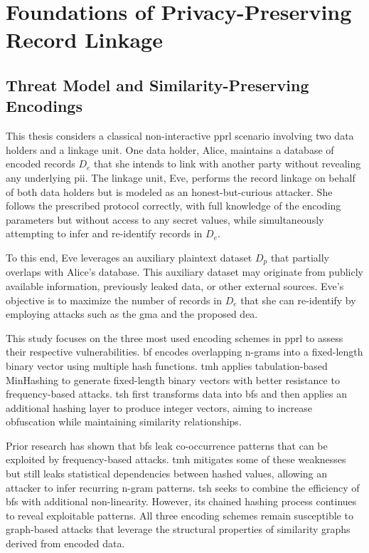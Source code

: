 \documentclass[a4paper,11pt]{scrartcl}
\begin{document}
\section{Foundations of Privacy-Preserving Record Linkage}

\subsection{Threat Model and Similarity-Preserving Encodings}
This thesis considers a classical non-interactive \ac{pprl} scenario involving two data holders and a linkage unit. 
One data holder, Alice, maintains a database of encoded records $D_e$ that she intends to link with another party without revealing any underlying \ac{pii}. 
The linkage unit, Eve, performs the record linkage on behalf of both data holders but is modeled as an honest-but-curious attacker.
She follows the prescribed protocol correctly, with full knowledge of the encoding parameters but without access to any secret values, while simultaneously attempting to infer and re-identify records in $D_e$.

To this end, Eve leverages an auxiliary plaintext dataset $D_p$ that partially overlaps with Alice’s database. 
This auxiliary dataset may originate from publicly available information, previously leaked data, or other external sources. 
Eve’s objective is to maximize the number of records in $D_e$ that she can re-identify by employing attacks such as the \ac{gma} and the proposed \ac{dea}.

This study focuses on the three most used encoding schemes in \ac{pprl} to assess their respective vulnerabilities. 
\ac{bf} encodes overlapping n-grams into a fixed-length binary vector using multiple hash functions. 
\ac{tmh} applies tabulation-based MinHashing to generate fixed-length binary vectors with better resistance to frequency-based attacks. 
\ac{tsh} first transforms data into \ac{bf}s and then applies an additional hashing layer to produce integer vectors, aiming to increase obfuscation while maintaining similarity relationships.

Prior research has shown that \ac{bf}s leak co-occurrence patterns that can be exploited by frequency-based attacks. 
\ac{tmh} mitigates some of these weaknesses but still leaks statistical dependencies between hashed values, allowing an attacker to infer recurring n-gram patterns.
\ac{tsh} seeks to combine the efficiency of \ac{bf}s with additional non-linearity.
However, its chained hashing process continues to reveal exploitable patterns. 
All three encoding schemes remain susceptible to graph-based attacks that leverage the structural properties of similarity graphs derived from encoded data.
\end{document}
